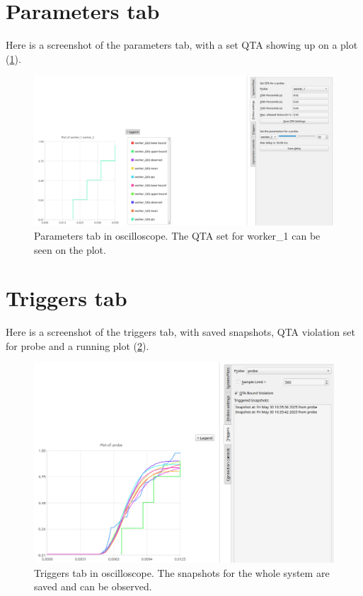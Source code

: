 \section{Parameters tab} \label{app:param_tab}
    Here is a screenshot of the parameters tab, with a set QTA showing up on a plot (\cref{fig:param_tab}).

    \begin{figure}[H]
        \begin{center}
            \includegraphics[width = \textwidth]{img/save_qta_manual.png}
        \end{center}
        \caption{Parameters tab in oscilloscope. The QTA set for worker\_1 can be seen on the plot.}
        \label{fig:param_tab}
    \end{figure}

\section{Triggers tab} \label{app:trig_tab}
    Here is a screenshot of the triggers tab, with saved snapshots, QTA violation set for probe and a running plot (\cref{fig:triggers_tab}).

   \begin{figure}[H]
        \begin{center}
            \includegraphics[width = \textwidth]{img/manual/triggers.png}
        \end{center}
        \caption{Triggers tab in oscilloscope. The snapshots for the whole system are saved and can be observed.}
        \label{fig:triggers_tab}
    \end{figure}


